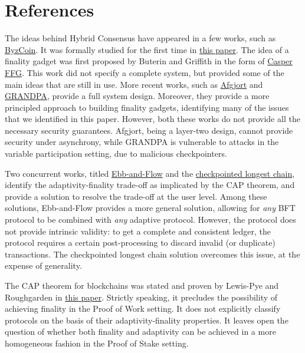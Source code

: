 \documentclass{article}
\begin{document}
\section*{References}
The ideas behind {\sf Hybrid Consensus} have appeared in a few works, such as \href{https://www.usenix.org/system/files/conference/usenixsecurity16/sec16_paper_kokoris-kogias.pdf}{ByzCoin}. It was formally studied for the first time in \href{https://eprint.iacr.org/2016/917.pdf}{this paper}. The idea of a finality gadget was first proposed by Buterin and Griffith in the form of \href{https://arxiv.org/pdf/1710.09437.pdf}{Casper FFG}. This work did not specify a complete system, but provided some of the main ideas that are still in use. More recent works, such as \href{https://eprint.iacr.org/2019/504.pdf}{Afgjort} and \href{https://arxiv.org/pdf/2007.01560.pdf}{GRANDPA}, provide a full system design. Moreover, they provide a more principled approach to building finality gadgets, identifying many of the issues that we identified in this paper. However, both these works do not provide all the necessary security guarantees. Afgjort, being a layer-two design, cannot provide security under asynchrony, while GRANDPA is vulnerable to attacks in the variable participation setting, due to malicious checkpointers.

Two concurrent works, titled \href{https://arxiv.org/abs/2009.04987}{Ebb-and-Flow} and the \href{https://arxiv.org/pdf/2010.13711.pdf}{checkpointed longest chain}, identify the adaptivity-finality trade-off as implicated by the CAP theorem, and provide a solution to resolve the trade-off at the user level. Among these solutions, Ebb-and-Flow provides a more general solution, allowing for \textit{any} BFT protocol to be combined with \textit{any} adaptive protocol. However, the protocol does not provide intrinsic validity: to get a complete and consistent ledger, the protocol requires a certain post-processing to discard invalid (or duplicate)  transactions. The checkpointed longest chain solution overcomes this issue, at the expense of generality.

The CAP theorem for blockchains was stated and proven by Lewis-Pye and Roughgarden in \href{https://arxiv.org/pdf/2006.10698.pdf}{this paper}. Strictly speaking, it precludes the possibility of achieving finality in the Proof of Work setting. It does not explicitly classify protocols on the basis of their adaptivity-finality properties. It leaves open the question of whether both finality and adaptivity can be achieved in a more homogeneous fashion in the Proof of Stake setting.
\end{document}

